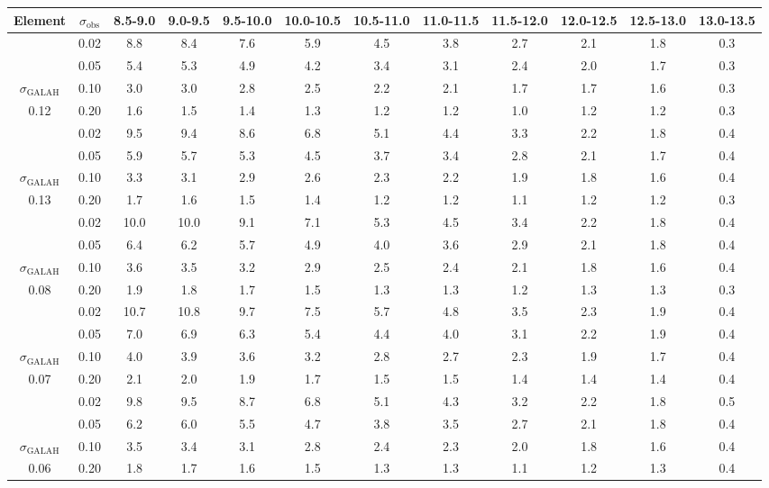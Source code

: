 \begin{tabular}{cccccccccccc}
\hline\hline
Element & $\sigma_\mathrm{obs}$  & 8.5-9.0 & 9.0-9.5 & 9.5-10.0 & 10.0-10.5 & 10.5-11.0 & 11.0-11.5 & 11.5-12.0 & 12.0-12.5 & 12.5-13.0 & 13.0-13.5 \\
\hline
[C/H] & 0.02 & 8.8 & 8.4 & 7.6 & 5.9 & 4.5 & 3.8 & 2.7 & 2.1 & 1.8 & 0.3 \\
 & 0.05 & 5.4 & 5.3 & 4.9 & 4.2 & 3.4 & 3.1 & 2.4 & 2.0 & 1.7 & 0.3 \\
$\sigma_\mathrm{GALAH}$ & 0.10 & 3.0 & 3.0 & 2.8 & 2.5 & 2.2 & 2.1 & 1.7 & 1.7 & 1.6 & 0.3 \\
0.12 & 0.20 & 1.6 & 1.5 & 1.4 & 1.3 & 1.2 & 1.2 & 1.0 & 1.2 & 1.2 & 0.3 \\
\hline
[O/H] & 0.02 & 9.5 & 9.4 & 8.6 & 6.8 & 5.1 & 4.4 & 3.3 & 2.2 & 1.8 & 0.4 \\
 & 0.05 & 5.9 & 5.7 & 5.3 & 4.5 & 3.7 & 3.4 & 2.8 & 2.1 & 1.7 & 0.4 \\
$\sigma_\mathrm{GALAH}$ & 0.10 & 3.3 & 3.1 & 2.9 & 2.6 & 2.3 & 2.2 & 1.9 & 1.8 & 1.6 & 0.4 \\
0.13 & 0.20 & 1.7 & 1.6 & 1.5 & 1.4 & 1.2 & 1.2 & 1.1 & 1.2 & 1.2 & 0.3 \\
\hline
[Mg/H] & 0.02 & 10.0 & 10.0 & 9.1 & 7.1 & 5.3 & 4.5 & 3.4 & 2.2 & 1.8 & 0.4 \\
 & 0.05 & 6.4 & 6.2 & 5.7 & 4.9 & 4.0 & 3.6 & 2.9 & 2.1 & 1.8 & 0.4 \\
$\sigma_\mathrm{GALAH}$ & 0.10 & 3.6 & 3.5 & 3.2 & 2.9 & 2.5 & 2.4 & 2.1 & 1.8 & 1.6 & 0.4 \\
0.08 & 0.20 & 1.9 & 1.8 & 1.7 & 1.5 & 1.3 & 1.3 & 1.2 & 1.3 & 1.3 & 0.3 \\
\hline
[Al/H] & 0.02 & 10.7 & 10.8 & 9.7 & 7.5 & 5.7 & 4.8 & 3.5 & 2.3 & 1.9 & 0.4 \\
 & 0.05 & 7.0 & 6.9 & 6.3 & 5.4 & 4.4 & 4.0 & 3.1 & 2.2 & 1.9 & 0.4 \\
$\sigma_\mathrm{GALAH}$ & 0.10 & 4.0 & 3.9 & 3.6 & 3.2 & 2.8 & 2.7 & 2.3 & 1.9 & 1.7 & 0.4 \\
0.07 & 0.20 & 2.1 & 2.0 & 1.9 & 1.7 & 1.5 & 1.5 & 1.4 & 1.4 & 1.4 & 0.4 \\
\hline
[Si/H] & 0.02 & 9.8 & 9.5 & 8.7 & 6.8 & 5.1 & 4.3 & 3.2 & 2.2 & 1.8 & 0.5 \\
 & 0.05 & 6.2 & 6.0 & 5.5 & 4.7 & 3.8 & 3.5 & 2.7 & 2.1 & 1.8 & 0.4 \\
$\sigma_\mathrm{GALAH}$ & 0.10 & 3.5 & 3.4 & 3.1 & 2.8 & 2.4 & 2.3 & 2.0 & 1.8 & 1.6 & 0.4 \\
0.06 & 0.20 & 1.8 & 1.7 & 1.6 & 1.5 & 1.3 & 1.3 & 1.1 & 1.2 & 1.3 & 0.4 \\

\end{tabular}
